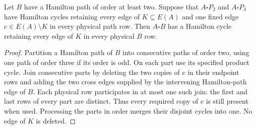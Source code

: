 
\begin{lemma}
Let $B$ have a Hamilton path of order at least two. Suppose that $A\square P_2$
and $A\square P_3$ have Hamilton cycles retaining every edge of $K\subseteq E(A)$
and one fixed edge $e\in E(A)\setminus K$ in every physical path row.
Then $A\square B$ has a Hamilton cycle retaining every edge of $K$ in every
physical $B$ row.
\end{lemma}
\begin{proof}
Partition a Hamilton path of $B$ into consecutive paths of order two,
using one path of order three if its order is odd. On each part use its
specified product cycle. Join consecutive parts by deleting the two copies
of $e$ in their endpoint rows and adding the two cross edges supplied by
the intervening Hamilton-path edge of $B$.
Each physical row participates in at most one such join: the first and
last rows of every part are distinct. Thus every required copy of $e$
is still present when used. Processing the parts in order merges their
disjoint cycles into one. No edge of $K$ is deleted.
\end{proof}


